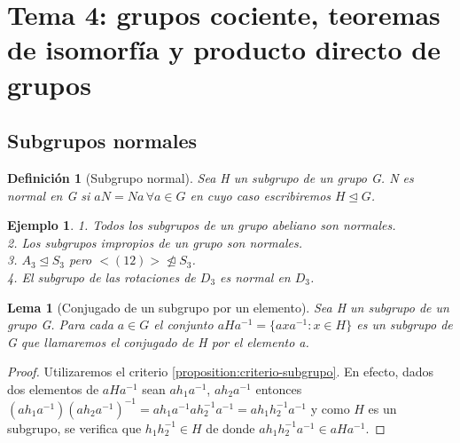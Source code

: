 \documentclass{article}
\theoremstyle{theorem-style}  %
\newtheorem{lemma}[theorem]{Lema}
\theoremstyle{definition-style}
\newtheorem{definition}{Definición}[section]
\theoremstyle{example-style}
\newtheorem{example}{Ejemplo}[section]
\begin{document}
\newpage
\section{Tema 4: grupos cociente, teoremas de isomorfía y producto directo de grupos}

\subsection{Subgrupos normales}

\begin{definition}[Subgrupo normal]
Sea H un subgrupo de un grupo G. N es normal en G si $aN = Na \, \forall a \in G$ en cuyo caso escribiremos $H \unlhd G$.
\end{definition}

\begin{example}
1. Todos los subgrupos de un grupo abeliano son normales.\\
2. Los subgrupos impropios de un grupo son normales.\\
3. $A_3 \trianglelefteq S_3$ pero $<(12)> \ntrianglelefteq S_3$.\\
4. El subgrupo de las rotaciones de $D_3$ es normal en $D_3$.
\end{example}

\begin{lemma}[Conjugado de un subgrupo por un elemento]
Sea H un subgrupo de un grupo G. Para cada $a \in G$ el conjunto $aHa^{-1} = \{axa^{-1}:x \in H\}$ es un subgrupo de G que llamaremos el conjugado de H por el elemento a. 
\end{lemma}
\begin{proof}
Utilizaremos el criterio \ref{proposition:criterio-subgrupo}. En efecto, dados dos elementos de $aHa^{-1}$ sean $ah_1a^{-1}$, $ah_2a^{-1}$ entonces $(ah_1a^{-1})(ah_2a^{-1})^{-1} = ah_1a^{-1}ah_2^{-1}a^{-1} = ah_1h_2^{-1}a^{-1}$ y como $H$ es un subgrupo, se verifica que $h_1h_2^{-1} \in H$ de donde $ah_1h_2^{-1}a^{-1} \in aHa^{-1}$.
\end{proof}
\end{document}
